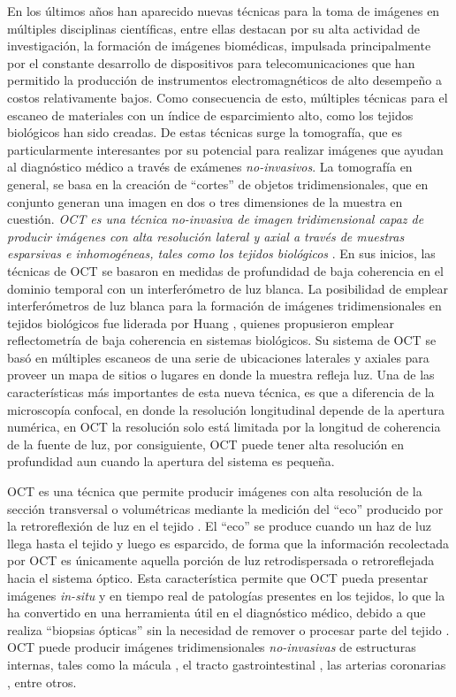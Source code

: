 En los últimos años han aparecido nuevas técnicas para la toma de imágenes en múltiples disciplinas científicas, entre ellas destacan por su alta actividad de investigación, la formación de imágenes biomédicas, impulsada principalmente por el constante desarrollo de dispositivos para telecomunicaciones que han permitido la producción de instrumentos electromagnéticos de alto desempeño a costos relativamente bajos. Como consecuencia de esto, múltiples técnicas para el escaneo de materiales con un índice de esparcimiento alto, como los tejidos biológicos han sido creadas. De estas técnicas surge la tomografía, que es particularmente interesantes por su potencial para realizar imágenes que ayudan al diagnóstico médico a través de exámenes \emph{no-invasivos}. La tomografía en general, se basa en la creación de ``cortes''  de objetos tridimensionales, que en conjunto generan una imagen en dos o tres dimensiones de la muestra en cuestión. \emph{OCT es una técnica no-invasiva de imagen tridimensional capaz de producir imágenes con alta resolución lateral y axial a través de muestras esparsivas e inhomogéneas, tales como los tejidos biológicos} \cite{Tomlins}. En sus inicios, las técnicas de OCT se basaron en medidas de profundidad de baja coherencia en el dominio temporal con un interferómetro de luz blanca. La posibilidad de emplear interferómetros de luz blanca para la formación de imágenes tridimensionales en tejidos biológicos fue liderada por Huang \etal \cite{Huang1991}, quienes propusieron emplear reflectometría de baja coherencia en sistemas biológicos. Su sistema de OCT se basó en múltiples escaneos de una serie de ubicaciones laterales y axiales para proveer un mapa de sitios o lugares en donde la muestra refleja luz. Una de las características más importantes de esta nueva técnica, es que a diferencia de la microscopía confocal, en donde la resolución longitudinal depende de la apertura numérica, en OCT la resolución solo está limitada por la longitud de coherencia de la fuente de luz, por consiguiente, OCT puede tener alta resolución en profundidad aun cuando la apertura del sistema es pequeña.

OCT es una técnica que permite producir imágenes con alta resolución de la sección transversal o volumétricas mediante la medición del ``eco'' producido por la retroreflexión de luz en el tejido \cite{Huang1991}. El ``eco'' se produce cuando un haz de luz llega hasta el tejido y luego es esparcido, de forma que la información recolectada por OCT es únicamente aquella porción de luz retrodispersada o retroreflejada hacia el sistema óptico. Esta característica permite que OCT pueda presentar imágenes \emph{in-situ} y en tiempo real de patologías presentes en los tejidos, lo que la ha convertido en una herramienta útil en el diagnóstico médico, debido a que realiza ``biopsias ópticas'' sin la necesidad de remover o procesar parte del tejido \cite{Brezinski1996}. OCT puede producir imágenes tridimensionales \emph{no-invasivas} de estructuras internas, tales como la mácula \cite{Hee1995_4}, el tracto gastrointestinal \cite{Tearney1997}, las arterias coronarias \cite{Tearney1996_2}, entre otros.

